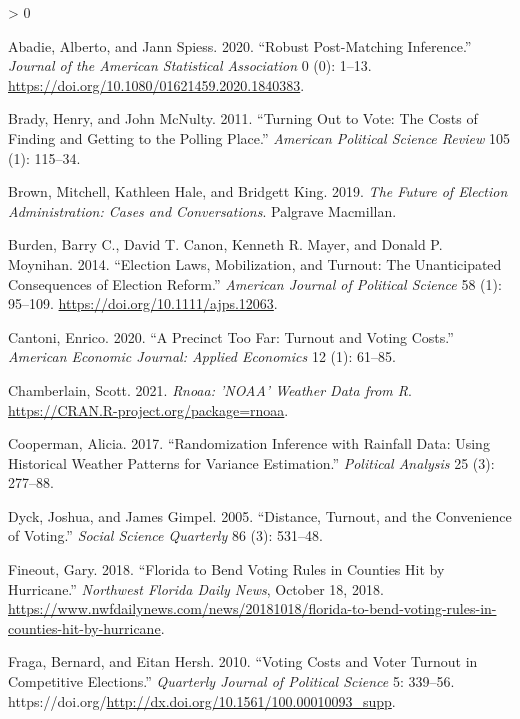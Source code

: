 \documentclass[
  12pt,
]{article}
\newlength{\cslhangindent}
\newenvironment{CSLReferences}[2] %
 {%
  \setlength{\parindent}{0pt}
  \ifodd #1 \everypar{\setlength{\hangindent}{\cslhangindent}}\ignorespaces\fi
  \ifnum #2 > 0
  \setlength{\parskip}{#2\baselineskip}
  \fi
 }%
 {}
\begin{document}
\hypertarget{refs}{}
\begin{CSLReferences}{1}{0}
\leavevmode\hypertarget{ref-Abadie2020}{}%
Abadie, Alberto, and Jann Spiess. 2020. {``Robust {Post}-{Matching Inference}.''} \emph{Journal of the American Statistical Association} 0 (0): 1--13. \url{https://doi.org/10.1080/01621459.2020.1840383}.

\leavevmode\hypertarget{ref-Brady2011}{}%
Brady, Henry, and John McNulty. 2011. {``Turning Out to Vote: {The Costs} of {Finding} and {Getting} to the {Polling Place}.''} \emph{American Political Science Review} 105 (1): 115--34.

\leavevmode\hypertarget{ref-Brown2019}{}%
Brown, Mitchell, Kathleen Hale, and Bridgett King. 2019. \emph{The {Future} of {Election Administration}: {Cases} and {Conversations}}. {Palgrave Macmillan}.

\leavevmode\hypertarget{ref-Burden2014}{}%
Burden, Barry C., David T. Canon, Kenneth R. Mayer, and Donald P. Moynihan. 2014. {``Election {Laws}, {Mobilization}, and {Turnout}: {The Unanticipated Consequences} of {Election Reform}.''} \emph{American Journal of Political Science} 58 (1): 95--109. \url{https://doi.org/10.1111/ajps.12063}.

\leavevmode\hypertarget{ref-Cantoni2020}{}%
Cantoni, Enrico. 2020. {``A {Precinct Too Far}: {Turnout} and {Voting Costs}.''} \emph{American Economic Journal: Applied Economics} 12 (1): 61--85.

\leavevmode\hypertarget{ref-Chamberlain2021}{}%
Chamberlain, Scott. 2021. \emph{Rnoaa: '{NOAA}' {Weather Data} from {R}}. \url{https://CRAN.R-project.org/package=rnoaa}.

\leavevmode\hypertarget{ref-Cooperman2017}{}%
Cooperman, Alicia. 2017. {``Randomization {Inference} with {Rainfall Data}: {Using Historical Weather Patterns} for {Variance Estimation}.''} \emph{Political Analysis} 25 (3): 277--88.

\leavevmode\hypertarget{ref-Dyck2005}{}%
Dyck, Joshua, and James Gimpel. 2005. {``Distance, {Turnout}, and the {Convenience} of {Voting}.''} \emph{Social Science Quarterly} 86 (3): 531--48.

\leavevmode\hypertarget{ref-Fineout2018}{}%
Fineout, Gary. 2018. {``Florida to Bend Voting Rules in Counties Hit by Hurricane.''} \emph{Northwest Florida Daily News}, October 18, 2018. \url{https://www.nwfdailynews.com/news/20181018/florida-to-bend-voting-rules-in-counties-hit-by-hurricane}.

\leavevmode\hypertarget{ref-Fraga2010}{}%
Fraga, Bernard, and Eitan Hersh. 2010. {``Voting {Costs} and {Voter Turnout} in {Competitive Elections}.''} \emph{Quarterly Journal of Political Science} 5: 339--56. https://doi.org/\url{http://dx.doi.org/10.1561/100.00010093_supp}.


\end{CSLReferences}
\end{document}
